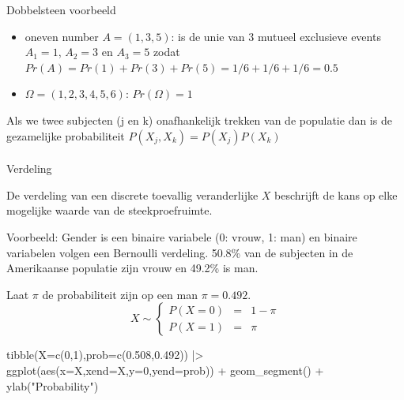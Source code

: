 \documentclass[
  dutch,
  letterpaper,
  12pt]{book}
\makeatletter
\let\oldparagraph\paragraph
\renewcommand{\paragraph}{
    \@ifstar
      \xxxParagraphStar
      \xxxParagraphNoStar
  }
\newcommand{\xxxParagraphStar}[1]{\oldparagraph*{#1}\mbox{}}
\newcommand{\xxxParagraphNoStar}[1]{\oldparagraph{#1}\mbox{}}
\newenvironment{Shaded}{\begin{snugshade}}{\end{snugshade}}
\newcommand{\AttributeTok}[1]{\textcolor[rgb]{0.40,0.45,0.13}{#1}}
\newcommand{\DecValTok}[1]{\textcolor[rgb]{0.68,0.00,0.00}{#1}}
\newcommand{\FloatTok}[1]{\textcolor[rgb]{0.68,0.00,0.00}{#1}}
\newcommand{\FunctionTok}[1]{\textcolor[rgb]{0.28,0.35,0.67}{#1}}
\newcommand{\NormalTok}[1]{\textcolor[rgb]{0.00,0.23,0.31}{#1}}
\newcommand{\SpecialCharTok}[1]{\textcolor[rgb]{0.37,0.37,0.37}{#1}}
\newcommand{\StringTok}[1]{\textcolor[rgb]{0.13,0.47,0.30}{#1}}
\providecommand{\tightlist}{%
  \setlength{\itemsep}{0pt}\setlength{\parskip}{0pt}}
\theoremstyle{definition}
\theoremstyle{definition}
\theoremstyle{definition}
\theoremstyle{remark}
\makeatother
\begin{document}
Dobbelsteen voorbeeld

\begin{itemize}
\tightlist
\item
  oneven number \(A=(1,3,5)\): is de unie van 3 mutueel exclusieve
  events \(A_1=1\), \(A_2=3\) en \(A_3=5\) zodat
  \(Pr(A)=Pr(1)+Pr(3)+Pr(5)=1/6+1/6+1/6=0.5\)
\item
  \(\Omega=(1,2,3,4,5,6)\): \(Pr(\Omega)=1\)
\end{itemize}

Als we twee subjecten (j en k) onafhankelijk trekken van de populatie
dan is de gezamelijke probabiliteit \(P(X_j,X_k)= P(X_j)P(X_k)\)

\paragraph{Verdeling}\label{verdeling}

De verdeling van een discrete toevallig veranderlijke \(X\) beschrijft
de kans op elke mogelijke waarde van de steekproefruimte.

Voorbeeld: Gender is een binaire variabele (0: vrouw, 1: man) en binaire
variabelen volgen een Bernoulli verdeling. 50.8\% van de subjecten in de
Amerikaanse populatie zijn vrouw en 49.2\% is man.

Laat \(\pi\) de probabiliteit zijn op een man \(\pi=0.492\).
\[ X\sim \left \{
    \begin{array}{lcl}
    P(X=0) &=& 1-\pi\\
    P(X=1) &=& \pi
    \end{array} \right . \]

\begin{Shaded}
\begin{Highlighting}[]
    \FunctionTok{tibble}\NormalTok{(}\AttributeTok{X=}\FunctionTok{c}\NormalTok{(}\DecValTok{0}\NormalTok{,}\DecValTok{1}\NormalTok{),}\AttributeTok{prob=}\FunctionTok{c}\NormalTok{(}\FloatTok{0.508}\NormalTok{,}\FloatTok{0.492}\NormalTok{)) }\SpecialCharTok{|\textgreater{}}
      \FunctionTok{ggplot}\NormalTok{(}\FunctionTok{aes}\NormalTok{(}\AttributeTok{x=}\NormalTok{X,}\AttributeTok{xend=}\NormalTok{X,}\AttributeTok{y=}\DecValTok{0}\NormalTok{,}\AttributeTok{yend=}\NormalTok{prob)) }\SpecialCharTok{+}
      \FunctionTok{geom\_segment}\NormalTok{() }\SpecialCharTok{+}
      \FunctionTok{ylab}\NormalTok{(}\StringTok{"Probability"}\NormalTok{)}
\end{Highlighting}
\end{Shaded}
\end{document}
